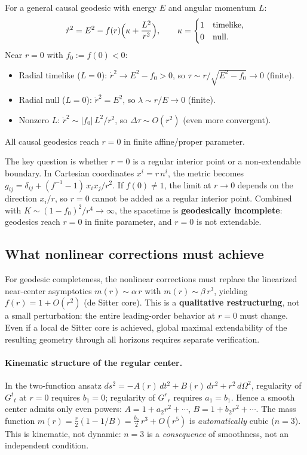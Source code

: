 \documentclass[11pt,a4paper]{article}
\theoremstyle{definition}
\theoremstyle{remark}
\begin{document}
For a general causal geodesic with energy $E$ and angular momentum $L$:
\begin{equation}
  \dot{r}^2 = E^2 - f(r)\Bigl(\kappa + \frac{L^2}{r^2}\Bigr),
  \qquad \kappa = \begin{cases} 1 & \text{timelike,} \\ 0 & \text{null.}\end{cases}
\end{equation}
Near $r = 0$ with $f_0 := f(0) < 0$:
\begin{itemize}
  \item Radial timelike ($L = 0$):
    $\dot{r}^2 \to E^2 - f_0 > 0$, so $\tau \sim r/\sqrt{E^2 - f_0} \to 0$ (finite).
  \item Radial null ($L = 0$):
    $\dot{r}^2 = E^2$, so $\lambda \sim r/E \to 0$ (finite).
  \item Nonzero $L$:
    $\dot{r}^2 \sim |f_0|\,L^2/r^2$, so $\Delta\tau \sim O(r^2)$ (even more convergent).
\end{itemize}
All causal geodesics reach $r = 0$ in finite affine/proper parameter.

The key question is whether $r = 0$ is a regular interior point or a non-extendable
boundary. In Cartesian coordinates $x^i = r\,n^i$, the metric becomes
$g_{ij} = \delta_{ij} + (f^{-1} - 1)\,x_i x_j / r^2$. If $f(0) \neq 1$, the
limit at $r \to 0$ depends on the direction $x_i/r$, so $r = 0$ cannot be added as
a regular interior point. Combined with $K \sim (1 - f_0)^2/r^4 \to \infty$, the
spacetime is \textbf{geodesically incomplete}: geodesics reach $r = 0$ in finite
parameter, and $r = 0$ is not extendable.

\subsection{What nonlinear corrections must achieve}

For geodesic completeness, the nonlinear corrections must replace the linearized
near-center asymptotics $m(r) \sim \alpha\,r$ with $m(r) \sim \beta\,r^3$, yielding
$f(r) = 1 + O(r^2)$ (de Sitter core). This is a \textbf{qualitative restructuring},
not a small perturbation: the entire leading-order behavior at $r = 0$ must change.
Even if a local de Sitter core is achieved, global maximal extendability of the
resulting geometry through all horizons requires separate verification.

\paragraph{Kinematic structure of the regular center.}
In the two-function ansatz $ds^2 = -A(r)\,dt^2 + B(r)\,dr^2 + r^2\,d\Omega^2$,
regularity of $G^t{}_t$ at $r = 0$ requires $b_1 = 0$; regularity of $G^r{}_r$
requires $a_1 = b_1$.  Hence a smooth center admits only even powers:
$A = 1 + a_2 r^2 + \cdots$, $B = 1 + b_2 r^2 + \cdots$.  The mass function
$m(r) = \tfrac{r}{2}(1 - 1/B) = \tfrac{b_2}{2}\,r^3 + O(r^5)$
is \emph{automatically} cubic ($n = 3$).  This is kinematic, not dynamic:
$n = 3$ is a \emph{consequence} of smoothness, not an independent condition.
\end{document}
